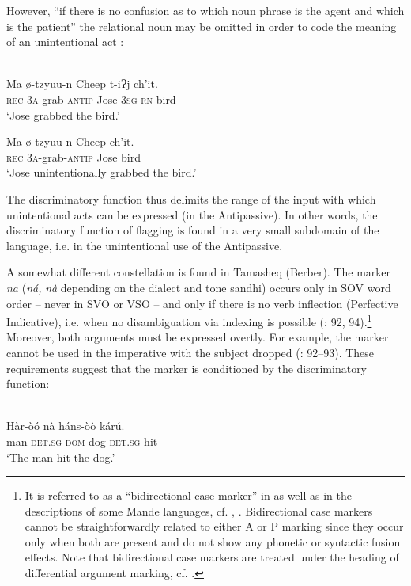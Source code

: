 \documentclass[output=paper]{langsci/langscibook}
\begin{document}
However, “if there is no confusion as to which noun phrase is the agent and which is the patient” the relational noun may be omitted in order to code the meaning of an unintentional act \citep[212]{England1983}:

\ea 
{}\\
\ea
\gll  Ma  ø-tzyuu-n   Cheep   t-iɁj    ch'it. \\
     \textsc{rec} 3\textsc{a}{}-grab-\textsc{antip}   Jose   3\textsc{sg}{}-\textsc{rn} bird\\
\glt ‘Jose grabbed the bird.’

\ex
\gll Ma  ø-tzyuu-n   Cheep   ch'it. \\
     \textsc{rec} 3\textsc{a}{}-grab-\textsc{antip}   Jose   bird\\
\glt ‘Jose unintentionally grabbed the bird.’
\z
\z

The discriminatory function thus delimits the range of the input with which unintentional acts can be expressed (in the Antipassive). In other words, the discriminatory function of flagging is found in a very small subdomain of the language, i.e. in the unintentional use of the Antipassive.

A somewhat different constellation is found in Tamasheq (Berber). The marker \textit{na} (\textit{ná,} \textit{nà} depending on the dialect and tone sandhi) occurs only in SOV word order – never in SVO or VSO – and only if there is no verb inflection (Perfective Indicative), i.e. when no disambiguation via indexing is possible (\citealt{Heath2007}: 92, 94).\footnote{It is referred to as a “bidirectional case marker” in \citet{Heath2007} as well as in the descriptions of some Mande languages, cf. \citet{Diagana1995}, \citet{Nikitina2018}. Bidirectional case markers cannot be straightforwardly related to either A or P marking since they occur only when both are present and do not show any phonetic or syntactic fusion effects. Note that bidirectional case markers are treated under the heading of differential argument marking, cf. \citet{Nikitina2018}.} Moreover, both arguments must be expressed overtly. For example, the marker cannot be used in the imperative with the subject dropped (\citealt{Heath2007}: 92–93). These requirements suggest that the marker is conditioned by the discriminatory function:

\ea 
{}\\
\gll Hàr-òó    nà  háns-òò  kárú.\\
     man-\textsc{det.sg}  \textsc{dom}  dog-\textsc{det.sg}  hit\\
\glt ‘The man hit the dog.’
\z
\end{document}
